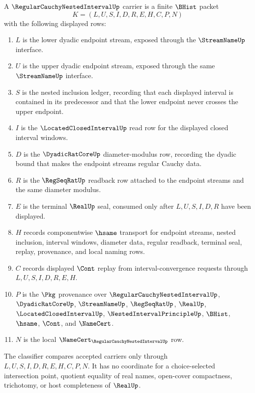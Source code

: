 \begin{definition}
\label{def:regular-cauchy-nested-interval-carrier}
A $\RegularCauchyNestedIntervalUp$ carrier is a finite $\BHist$ packet
$$
K=(L,U,S,I,D,R,E,H,C,P,N)
$$
with the following displayed rows:
\begin{enumerate}
\item $L$ is the lower dyadic endpoint stream, exposed through the $\StreamNameUp$ interface.
\item $U$ is the upper dyadic endpoint stream, exposed through the same $\StreamNameUp$ interface.
\item $S$ is the nested inclusion ledger, recording that each displayed interval is contained in its predecessor and that the lower endpoint never crosses the upper endpoint.
\item $I$ is the $\LocatedClosedIntervalUp$ read row for the displayed closed interval windows.
\item $D$ is the $\DyadicRatCoreUp$ diameter-modulus row, recording the dyadic bound that makes the endpoint streams regular Cauchy data.
\item $R$ is the $\RegSeqRatUp$ readback row attached to the endpoint streams and the same diameter modulus.
\item $E$ is the terminal $\RealUp$ seal, consumed only after $L,U,S,I,D,R$ have been displayed.
\item $H$ records componentwise $\hsame$ transport for endpoint streams, nested inclusion, interval windows, diameter data, regular readback, terminal seal, replay, provenance, and local naming rows.
\item $C$ records displayed $\Cont$ replay from interval-convergence requests through $L,U,S,I,D,R,E,H$.
\item $P$ is the $\Pkg$ provenance over $\RegularCauchyNestedIntervalUp$, $\DyadicRatCoreUp$, $\StreamNameUp$, $\RegSeqRatUp$, $\RealUp$, $\LocatedClosedIntervalUp$, $\NestedIntervalPrincipleUp$, $\BHist$, $\hsame$, $\Cont$, and $\NameCert$.
\item $N$ is the local $\NameCert_{\RegularCauchyNestedIntervalUp}$ row.
\end{enumerate}
The classifier compares accepted carriers only through $L,U,S,I,D,R,E,H,C,P,N$. It has no coordinate for a choice-selected intersection point, quotient equality of real names, open-cover compactness, trichotomy, or host completeness of $\RealUp$.
\end{definition}

